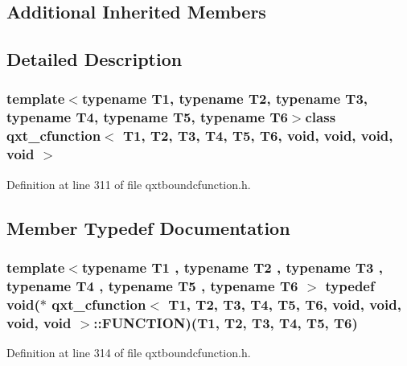 \subsection*{Additional Inherited Members}


\subsection{Detailed Description}
\subsubsection*{template$<$typename T1, typename T2, typename T3, typename T4, typename T5, typename T6$>$class qxt\-\_\-cfunction$<$ T1, T2, T3, T4, T5, T6, void, void, void, void $>$}



Definition at line 311 of file qxtboundcfunction.\-h.



\subsection{Member Typedef Documentation}
\hypertarget{classqxt__cfunction_3_01_t1_00_01_t2_00_01_t3_00_01_t4_00_01_t5_00_01_t6_00_01void_00_01void_00_01void_00_01void_01_4_ad065c3b6117a01910e5e31c9d1d0e050}{
\subsubsection[{F\-U\-N\-C\-T\-I\-O\-N}]{\setlength{\rightskip}{0pt plus 5cm}template$<$typename T1 , typename T2 , typename T3 , typename T4 , typename T5 , typename T6 $>$ typedef {\bf void}($\ast$ {\bf qxt\-\_\-cfunction}$<$ T1, T2, T3, T4, T5, T6, {\bf void}, {\bf void}, {\bf void}, {\bf void} $>$\-::F\-U\-N\-C\-T\-I\-O\-N)(T1, T2, T3, T4, T5, T6)}}\label{classqxt__cfunction_3_01_t1_00_01_t2_00_01_t3_00_01_t4_00_01_t5_00_01_t6_00_01void_00_01void_00_01void_00_01void_01_4_ad065c3b6117a01910e5e31c9d1d0e050}


Definition at line 314 of file qxtboundcfunction.\-h.



